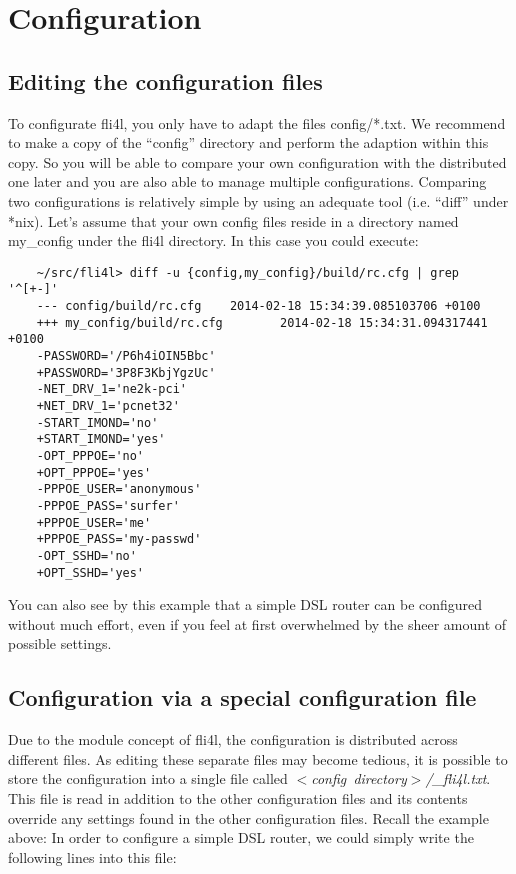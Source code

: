 \section{Configuration}
\subsection{Editing the configuration files}

To configurate fli4l, you only have to adapt the files config/*.txt.
We recommend to make a copy of the ``config'' directory and perform
the adaption within this copy. So you will be able to compare your own
configuration with the distributed one later and you are also
able to manage multiple configurations. Comparing two configurations
is relatively simple by using an adequate tool (i.e. ``diff'' under *nix).
Let's assume that your own config files reside in a directory named
my\_config under the fli4l directory. In this case you could execute:
\begin{example}
\begin{verbatim}
    ~/src/fli4l> diff -u {config,my_config}/build/rc.cfg | grep '^[+-]'
    --- config/build/rc.cfg    2014-02-18 15:34:39.085103706 +0100
    +++ my_config/build/rc.cfg        2014-02-18 15:34:31.094317441 +0100
    -PASSWORD='/P6h4iOIN5Bbc'
    +PASSWORD='3P8F3KbjYgzUc'
    -NET_DRV_1='ne2k-pci'
    +NET_DRV_1='pcnet32'
    -START_IMOND='no'
    +START_IMOND='yes'
    -OPT_PPPOE='no'
    +OPT_PPPOE='yes'
    -PPPOE_USER='anonymous'
    -PPPOE_PASS='surfer'
    +PPPOE_USER='me'
    +PPPOE_PASS='my-passwd'
    -OPT_SSHD='no'
    +OPT_SSHD='yes'
\end{verbatim}
\end{example}

You can also see by this example that a simple DSL router can be configured
without much effort, even if you feel at first overwhelmed by the sheer amount of
possible settings.

\subsection{Configuration via a special configuration file}

Due to the module concept of fli4l, the configuration is distributed across
different files. As editing these separate files may become tedious, it is
possible to store the configuration into a single file called
\emph{$<$config~directory$>$/\_fli4l.txt}. This file is read in addition to the
other configuration files and its contents override any settings
found in the other configuration files. Recall the example above: In order to
configure a simple DSL router, we could simply write the following lines into
this file:

